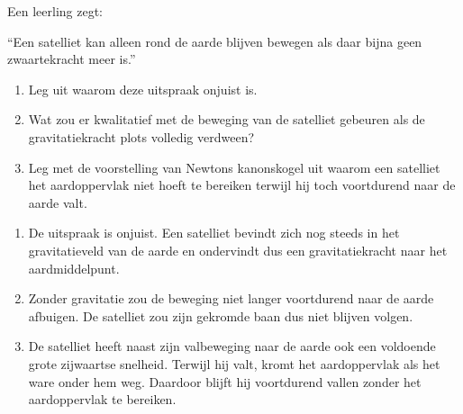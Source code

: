 \documentclass{ximera}
\begin{document}
\begin{oefening}{\oefU}

Een leerling zegt:

\begin{center}
``Een satelliet kan alleen rond de aarde blijven bewegen als daar bijna
geen zwaartekracht meer is.''
\end{center}

\begin{enumerate}
  \item Leg uit waarom deze uitspraak onjuist is.
  \item Wat zou er kwalitatief met de beweging van de satelliet gebeuren
        als de gravitatiekracht plots volledig verdween?
  \item Leg met de voorstelling van Newtons kanonskogel uit waarom een
        satelliet het aardoppervlak niet hoeft te bereiken terwijl hij
        toch voortdurend naar de aarde valt.
\end{enumerate}

\begin{oplossing}

\begin{enumerate}
  \item De uitspraak is onjuist. Een satelliet bevindt zich nog steeds in
        het gravitatieveld van de aarde en ondervindt dus een
        gravitatiekracht naar het aardmiddelpunt.

  \item Zonder gravitatie zou de beweging niet langer voortdurend naar de
        aarde afbuigen. De satelliet zou zijn gekromde baan dus niet
        blijven volgen.

  \item De satelliet heeft naast zijn valbeweging naar de aarde ook een
        voldoende grote zijwaartse snelheid. Terwijl hij valt, kromt het
        aardoppervlak als het ware onder hem weg. Daardoor blijft hij
        voortdurend vallen zonder het aardoppervlak te bereiken.
\end{enumerate}

\end{oplossing}
\end{oefening}
\end{document}
